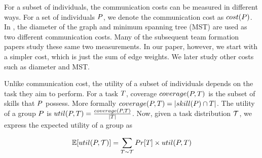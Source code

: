 For a subset of individuals, the communication costs can be measured in different ways. 
For a set of individuals $P$, we denote the communication cost as $cost(P)$. 
In \cite{lappas2009finding}, the diameter of the graph and minimum spanning tree (MST) are used as two different communication costs.
Many of the subsequent team formation papers study these same two measurements.
In our paper, however, we start with a simpler cost, which is just the sum of edge weights.
We later study other costs such as diameter and MST. 

Unlike communication cost, the utility of a subset of individuals depends on the task they aim to perform. 
For a task $T$, coverage $coverage(P,T)$ is the subset of skills that $P$ possess.
More formally $coverage(P,T) = |skill(P) \cap T|$.
The utility of a group $ P $ is ${util}(P,T) = \frac{coverage(P, T)}{|T|}$.
Now, given a task distribution $\mathcal{T}$, we express the expected utility of a group as 

$$\mathbb{E}[{util}(P,\mathcal{T})] = \sum_{T \sim \mathcal{T} } Pr[T] \times {util}(P, T) $$ \\

\begin{comment}
The nodes in graph $\org(\nodes, \edges)$, represented by the set $\nodes = \{\hiredset \cup \candidates\}$, denote the people. As can be seen that it includes the people that are present in the organization already $\hiredset$ and the set of candidates $\candidates$. The edge set of graph $\org$ is denoted by $\edges$. An edge $\edge \in \edges$ is weighted, the weight $\weight(\edge)$ denotes the communication cost between the two people which are the endpoints of $\edge$. We assume the weight of all the edges involving even the candidates are known. 

Further we use the notation $\org_{\nodes'}$ to denote the induced sub graph of $\org$ taken over the node set $\nodes'$.
 



\subsubsection{Utility of an hire}
The utility of the hire depends on the people who are hired and the tasks for which they are hired. Precisely we assume the $\utility(\org_{\nodes'},\task)$ denotes the utility of a node set $\nodes'$, people who are hired, for a task $\task \in \tasks$. The overall utility can then be computed as,
$$\utility(\org_{\nodes'}, \tasks) = \sum_{i} Pr[T_i] \times \utility (\org_{\nodes'}, \task) $$

Given this utility measure, we next proceed to define the expected gain from a possible hire set. Recall $\hireset$ denotes a possible set of hiring. Then the gain of this hire is,
$$\gain(\hireset) = \utility(\org_{\hiredset \cup \hireset},\tasks) - \utility(\org_{\hiredset},\tasks) $$

We are now ready to define our problem of hiring a team that maximizes hiring utility.
\end{comment}


